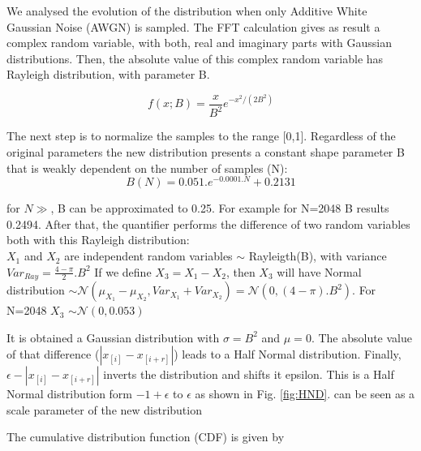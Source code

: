 \documentclass[lettersize,journal]{IEEEtran}
\begin{document}

We analysed the evolution of the distribution when only Additive White Gaussian Noise (AWGN) is sampled. The FFT calculation gives as result a complex random variable, with both, real and imaginary parts with Gaussian distributions. Then, the absolute value of this complex random variable has Rayleigh distribution, with parameter B.

\begin{equation}
    \label{rayL}
f(x;B)= \frac{x}{B^2} e^{-x^2/(2B^2)}
\end{equation}

The next step is to normalize the samples to the range [0,1]. Regardless of the original parameters the new distribution presents a constant  shape parameter B that is weakly dependent on the number of samples (N):
\begin{equation}
    \label{B}
    B(N)=0.051. e^{-0.0001.N}+0.2131
\end{equation}

for $N \gg$, B can be approximated to 0.25. For example for N=2048 B results 0.2494.
After that, the quantifier performs the difference of two random variables both with this Rayleigh distribution:\\
$X_{1}$ and $X_{2}$ are independent random variables $\sim$ Rayleigth(B), with variance $Var_{Ray}=\frac{4-\pi}{2}.B^2$ 
If we define $X_{3}=X_{1}-X_{2}$, then $X_{3}$ will have Normal distribution $\sim \mathcal{N}(\mu_{X_1}-\mu_{X_2},Var_{X_1}+Var_{X_2})=\mathcal{N}(0,(4-\pi).B^2)$. For N=2048 $X_{3}$ $\sim \mathcal{N}(0,0.053)$

It is obtained a Gaussian distribution with $\sigma=B^2$ and $\mu=0$.
The absolute value of that difference ($| x_{[i]}-x_{[i+r]}|$) leads to a Half Normal distribution.
Finally, $ \epsilon- |x_{[i]}-x_{[i+r]}|$ inverts the distribution and shifts it epsilon. This is a Half Normal distribution form  $-1+\epsilon$ to $\epsilon$ as shown in Fig. \ref{fig:HND}.
can be seen as a scale parameter of the new distribution

The cumulative distribution function (CDF) is given by
\end{document}
